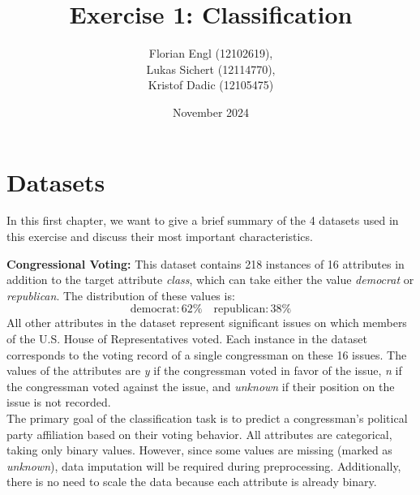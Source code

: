 \documentclass[a4paper,10pt]{article}
\title{Exercise 1: Classification}
\author{Florian Engl (12102619),\\ Lukas Sichert (12114770),\\ Kristof Dadic (12105475)}
\date{November 2024}
\begin{document}
\maketitle

\tableofcontents


\section{Datasets}

In this first chapter, we want to give a brief summary of the 4 datasets used in this exercise and discuss their most important characteristics.

\textbf{Congressional Voting:} This dataset contains 218 instances of 16 attributes in addition to the target attribute \emph{class}, which can take either the value \emph{democrat} or \emph{republican}. The distribution of these values is:
\begin{equation*}
    \text{democrat:}\,62\% \quad \text{republican:}\,38\%
\end{equation*}
All other attributes in the dataset represent significant issues on which members of the U.S. House of Representatives voted. Each instance in the dataset corresponds to the voting record of a single congressman on these 16 issues. The values of the attributes are \emph{y} if the congressman voted in favor of the issue, \emph{n} if the congressman voted against the issue, and \emph{unknown} if their position on the issue is not recorded. \\
The primary goal of the classification task is to predict a congressman’s political party affiliation based on their voting behavior. All attributes are categorical, taking only binary values. However, since some values are missing (marked as \emph{unknown}), data imputation will be required during preprocessing. Additionally, there is no need to scale the data because each attribute is already binary.
\end{document}
